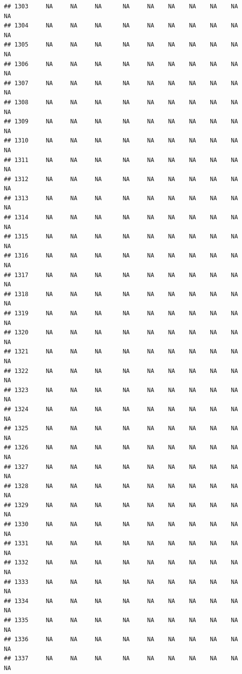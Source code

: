 \documentclass{article}\usepackage{graphicx, color}
\makeatletter
\newenvironment{kframe}{%
 \def\at@end@of@kframe{}%
 \ifinner\ifhmode%
  \def\at@end@of@kframe{\end{minipage}}%
  \begin{minipage}{\columnwidth}%
 \fi\fi%
 \def\FrameCommand##1{\hskip\@totalleftmargin \hskip-\fboxsep
 \colorbox{shadecolor}{##1}\hskip-\fboxsep
     \hskip-\linewidth \hskip-\@totalleftmargin \hskip\columnwidth}%
 \MakeFramed {\advance\hsize-\width
   \@totalleftmargin\z@ \linewidth\hsize
   \@setminipage}}%
 {\par\unskip\endMakeFramed%
 \at@end@of@kframe}
\newenvironment{knitrout}{}{} %
\makeatother
\begin{document}
\begin{knitrout}
\begin{kframe}
\begin{verbatim}
## 1303     NA     NA     NA      NA     NA    NA    NA    NA    NA     NA
## 1304     NA     NA     NA      NA     NA    NA    NA    NA    NA     NA
## 1305     NA     NA     NA      NA     NA    NA    NA    NA    NA     NA
## 1306     NA     NA     NA      NA     NA    NA    NA    NA    NA     NA
## 1307     NA     NA     NA      NA     NA    NA    NA    NA    NA     NA
## 1308     NA     NA     NA      NA     NA    NA    NA    NA    NA     NA
## 1309     NA     NA     NA      NA     NA    NA    NA    NA    NA     NA
## 1310     NA     NA     NA      NA     NA    NA    NA    NA    NA     NA
## 1311     NA     NA     NA      NA     NA    NA    NA    NA    NA     NA
## 1312     NA     NA     NA      NA     NA    NA    NA    NA    NA     NA
## 1313     NA     NA     NA      NA     NA    NA    NA    NA    NA     NA
## 1314     NA     NA     NA      NA     NA    NA    NA    NA    NA     NA
## 1315     NA     NA     NA      NA     NA    NA    NA    NA    NA     NA
## 1316     NA     NA     NA      NA     NA    NA    NA    NA    NA     NA
## 1317     NA     NA     NA      NA     NA    NA    NA    NA    NA     NA
## 1318     NA     NA     NA      NA     NA    NA    NA    NA    NA     NA
## 1319     NA     NA     NA      NA     NA    NA    NA    NA    NA     NA
## 1320     NA     NA     NA      NA     NA    NA    NA    NA    NA     NA
## 1321     NA     NA     NA      NA     NA    NA    NA    NA    NA     NA
## 1322     NA     NA     NA      NA     NA    NA    NA    NA    NA     NA
## 1323     NA     NA     NA      NA     NA    NA    NA    NA    NA     NA
## 1324     NA     NA     NA      NA     NA    NA    NA    NA    NA     NA
## 1325     NA     NA     NA      NA     NA    NA    NA    NA    NA     NA
## 1326     NA     NA     NA      NA     NA    NA    NA    NA    NA     NA
## 1327     NA     NA     NA      NA     NA    NA    NA    NA    NA     NA
## 1328     NA     NA     NA      NA     NA    NA    NA    NA    NA     NA
## 1329     NA     NA     NA      NA     NA    NA    NA    NA    NA     NA
## 1330     NA     NA     NA      NA     NA    NA    NA    NA    NA     NA
## 1331     NA     NA     NA      NA     NA    NA    NA    NA    NA     NA
## 1332     NA     NA     NA      NA     NA    NA    NA    NA    NA     NA
## 1333     NA     NA     NA      NA     NA    NA    NA    NA    NA     NA
## 1334     NA     NA     NA      NA     NA    NA    NA    NA    NA     NA
## 1335     NA     NA     NA      NA     NA    NA    NA    NA    NA     NA
## 1336     NA     NA     NA      NA     NA    NA    NA    NA    NA     NA
## 1337     NA     NA     NA      NA     NA    NA    NA    NA    NA     NA

\end{verbatim}
\end{kframe}
\end{knitrout}
\end{document}
